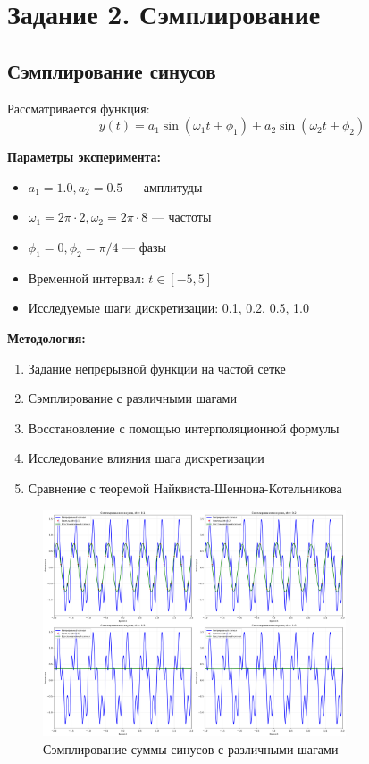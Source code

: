 \section*{Задание 2. Сэмплирование}

\subsection*{Сэмплирование синусов}

Рассматривается функция:
\begin{equation}
y(t) = a_1 \sin(\omega_1 t + \phi_1) + a_2 \sin(\omega_2 t + \phi_2)
\end{equation}

\textbf{Параметры эксперимента:}
\begin{itemize}
    \item $a_1 = 1.0, a_2 = 0.5$ — амплитуды
    \item $\omega_1 = 2\pi \cdot 2, \omega_2 = 2\pi \cdot 8$ — частоты
    \item $\phi_1 = 0, \phi_2 = \pi/4$ — фазы
    \item Временной интервал: $t \in [-5, 5]$
    \item Исследуемые шаги дискретизации: 0.1, 0.2, 0.5, 1.0
\end{itemize}

\textbf{Методология:}
\begin{enumerate}
    \item Задание непрерывной функции на частой сетке
    \item Сэмплирование с различными шагами
    \item Восстановление с помощью интерполяционной формулы
    \item Исследование влияния шага дискретизации
    \item Сравнение с теоремой Найквиста-Шеннона-Котельникова
\end{enumerate}

\begin{figure}[H]
    \centering
    \includegraphics[width=0.8\textwidth]{images/task2/sampling_sines.png}
    \caption{Сэмплирование суммы синусов с различными шагами}
    \label{fig:sampling_sines}
\end{figure}

